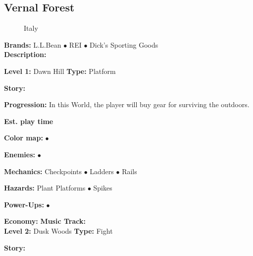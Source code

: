 \documentclass[12pt]{article}
\begin{document}
\subsection{Vernal Forest}
\begin{figure}[h]
    \centering
    \textcolor[HTML]{00FF00}{}
    \caption{Italy}
\end{figure}
\begin{addmargin}[5mm]{0em}
\textbf{Brands:} L.L.Bean $\bullet$ REI $\bullet$ Dick's Sporting Goods \\
\noindent \textbf{Description:} 
\end{addmargin}
\begin{multicols}{2}
\noindent \textbf{Level 1:} Dawn Hill \newline
\indent \textbf{Type:} Platform
\begin{addmargin}[5mm]{0em}
\textbf{Story:} 
\end{addmargin}
\begin{addmargin}[5mm]{0em}
\textbf{Progression:} In this World, the player will buy gear for surviving the outdoors.
\end{addmargin}
\indent\indent \textbf{Est. play time}
\begin{addmargin}[5mm]{0em}
\textbf{Color map:} $\bullet$
\end{addmargin}
\begin{addmargin}[5mm]{0em}
\textbf{Enemies:} $\bullet$
\end{addmargin}
\begin{addmargin}[5mm]{0em}
\textbf{Mechanics:} Checkpoints $\bullet$ Ladders $\bullet$ Rails
\end{addmargin}
\begin{addmargin}[5mm]{0em}
\textbf{Hazards:} Plant Platforms $\bullet$ Spikes
\end{addmargin}
\begin{addmargin}[5mm]{0em}
\textbf{Power-Ups:} $\bullet$
\end{addmargin}
\indent\indent \textbf{Economy:}  \newline
\indent \textbf{Music Track:} 
\\
\columnbreak
\noindent \textbf{Level 2:} Dusk Woods \newline
\indent \textbf{Type:} Fight
\begin{addmargin}[5mm]{0em}
\textbf{Story:} 
\end{addmargin}
\begin{addmargin}[5mm]{0em}

\end{addmargin}
\end{multicols}
\end{document}
